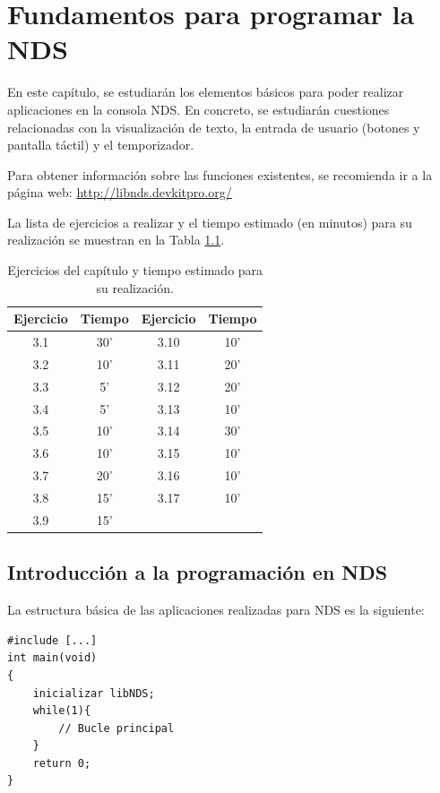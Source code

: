 \chapter{Fundamentos para programar la NDS}

En este capítulo, se estudiarán los elementos básicos para poder realizar aplicaciones en la consola NDS. En concreto, se estudiarán cuestiones relacionadas con la visualización de texto, la entrada de usuario (botones y pantalla táctil) y el temporizador. 

Para obtener información sobre las funciones existentes, se recomienda ir a la página web: \url{http://libnds.devkitpro.org/}

La lista de ejercicios a realizar y el tiempo estimado (en minutos) para su realización se muestran en la Tabla \ref{c3_tab:ejercios}.

\begin{table}[t]
\centering
\caption{Ejercicios del capítulo y tiempo estimado para su realización.}
\begin{tabular}{|c|c|c|c|}
\hline 
Ejercicio & Tiempo & Ejercicio & Tiempo  \\ 
\hline 
 3.1 & 30' & 3.10 & 10' \\ 
 3.2 & 10' & 3.11 & 20' \\ 
 3.3 & 5'  & 3.12 & 20' \\ 
 3.4 & 5'  & 3.13 & 10' \\ 
 3.5 & 10' & 3.14 & 30' \\ 
 3.6 & 10' & 3.15 & 10' \\ 
 3.7 & 20' & 3.16 & 10' \\ 
 3.8 & 15' & 3.17 & 10' \\ 
 3.9 & 15' &      & \\ 
\hline 
\end{tabular} 
\label{c3_tab:ejercios}
\end{table}
\section{Introducción a la programación en NDS}
La estructura básica de las aplicaciones realizadas para NDS es la siguiente:

\begin{lstlisting}
#include [...] 
int main(void)
{
	inicializar libNDS; 
	while(1){
		// Bucle principal 
	}
	return 0;
}
\end{lstlisting}


